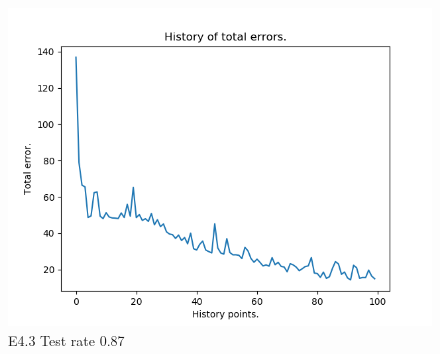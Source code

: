\documentclass{classrep}
\begin{document}
\begin{figure}[H]
			\begin{minipage}{0.5\linewidth}
				\centering
				\includegraphics[scale=0.25]{seeds_nn_i5000.png}
				\caption{E4.3 Test rate  0.87}
				\label{E4.3}
			\end{minipage}
		\end{figure}
		\FloatBarrier
\end{document}
